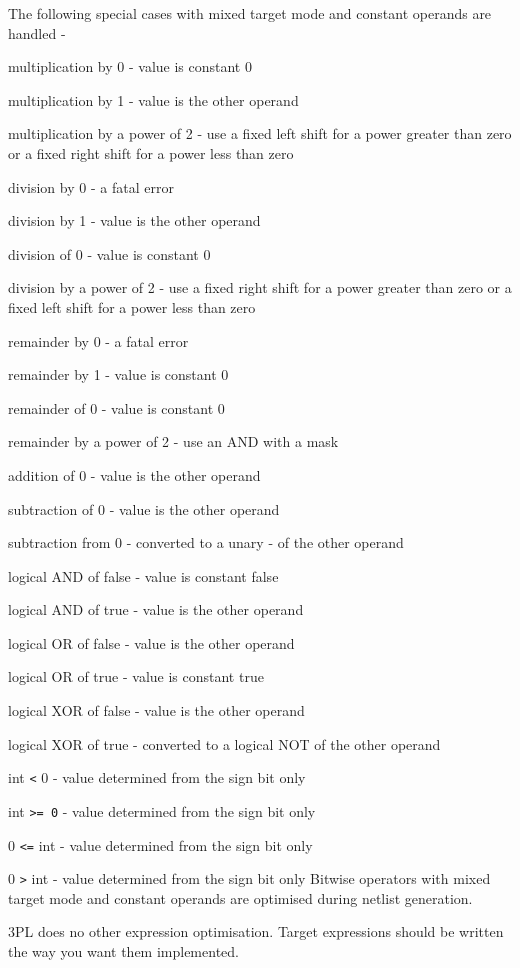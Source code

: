             The following special cases with mixed target mode and constant
            operands are handled -
            \blist
            \item   multiplication by 0 - value is constant 0
            \item   multiplication by 1 - value is the other operand
            \item   multiplication by a power of 2 - use a fixed left shift
                    for a power greater than zero or a fixed right shift
                    for a power less than zero
            \item   division by 0 - a fatal error
            \item   division by 1 - value is the other operand
            \item   division of 0 - value is constant 0
            \item   division by a power of 2 - use a fixed right shift for a
                    power greater than zero or a fixed left shift for a power
                    less than zero
            \item   remainder by 0 - a fatal error
            \item   remainder by 1 - value is constant 0
            \item   remainder of 0 - value is constant 0
            \item   remainder by a power of 2 - use an AND with a mask
            \item   addition of 0 - value is the other operand
            \item   subtraction of 0 - value is the other operand
            \item   subtraction from 0 - converted to a unary - of the other
                    operand
            \item   logical AND of false - value is constant false
            \item   logical AND of true - value is the other operand
            \item   logical OR of false - value is the other operand
            \item   logical OR of true - value is constant true
            \item   logical XOR of false - value is the other operand
            \item   logical XOR of true - converted to a logical NOT of the
                    other operand
            \item   int \verb'<' 0 - value determined from the sign bit only
            \item   int \verb'>= 0' - value determined from the sign bit only
            \item   0 \verb'<=' int - value determined from the sign bit only
            \item   0 \verb'>' int - value determined from the sign bit only
            \blend
            Bitwise operators with mixed target mode and constant operands are
            optimised during netlist generation.
            
            3PL does no other expression optimisation. Target
            expressions should be written the way you want them implemented.
